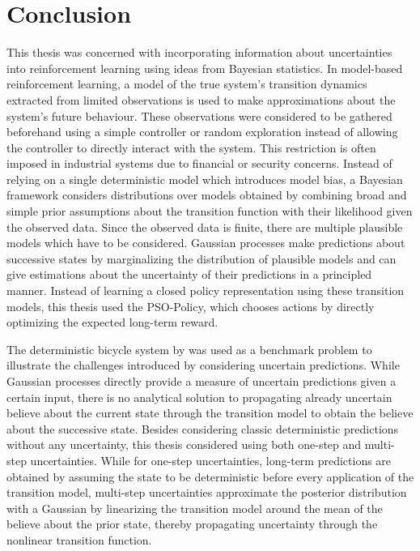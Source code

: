 \chapter{Conclusion}
This thesis was concerned with incorporating information about uncertainties into reinforcement learning using ideas from Bayesian statistics.
In model-based reinforcement learning, a model of the true system's transition dynamics extracted from limited observations is used to make approximations about the system's future behaviour.
These observations were considered to be gathered beforehand using a simple controller or random exploration instead of allowing the controller to directly interact with the system.
This restriction is often imposed in industrial systems due to financial or security concerns.
Instead of relying on a single deterministic model which introduces model bias, a Bayesian framework considers distributions over models obtained by combining broad and simple prior assumptions about the transition function with their likelihood given the observed data.
Since the observed data is finite, there are multiple plausible models which have to be considered.
Gaussian processes make predictions about successive states by marginalizing the distribution of plausible models and can give estimations about the uncertainty of their predictions in a principled manner.
Instead of learning a closed policy representation using these transition models, this thesis used the PSO-Policy, which chooses actions by directly optimizing the expected long-term reward.

The deterministic bicycle system by \citeauthor{randlov_learning_1998} was used as a benchmark problem to illustrate the challenges introduced by considering uncertain predictions.
While Gaussian processes directly provide a measure of uncertain predictions given a certain input, there is no analytical solution to propagating already uncertain believe about the current state through the transition model to obtain the believe about the successive state.
Besides considering classic deterministic predictions without any uncertainty, this thesis considered using both one-step and multi-step uncertainties.
While for one-step uncertainties, long-term predictions are obtained by assuming the state to be deterministic before every application of the transition model, multi-step uncertainties approximate the posterior distribution with a Gaussian by linearizing the transition model around the mean of the believe about the prior state, thereby propagating uncertainty through the nonlinear transition function.

